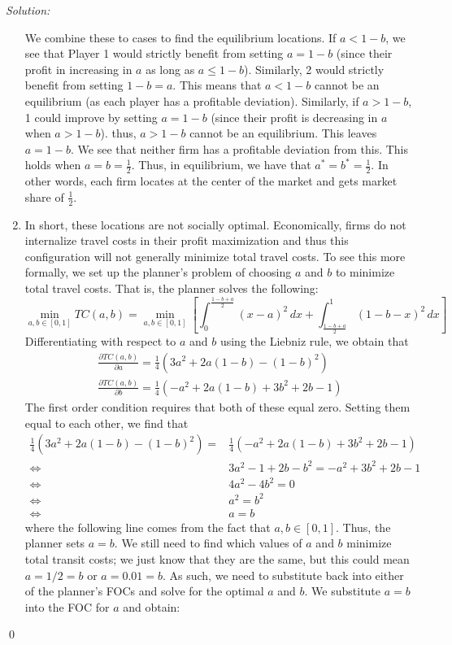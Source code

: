 \documentclass[12pt]{article}
\newenvironment{sol}
    {\emph{Solution:}
    }
    {
    \qed
    }
\begin{document}
\begin{sol}
\begin{enumerate}[label=\alph*) ]
         We combine these to cases to find the equilibrium locations. If $a < 1-b$, we see that Player 1 would strictly benefit from setting $a = 1-b$ (since their profit in increasing in $a$ as long as $a \leq 1-b$). Similarly, 2 would strictly benefit from setting $1- b = a$. This means that $a < 1-b$ cannot be an equilibrium (as each player has a profitable deviation). Similarly, if $a > 1-b$, 1 could improve by setting $a = 1-b$ (since their profit is decreasing in $a$ when $a > 1-b$). thus, $a > 1-b$ cannot be an equilibrium. This leaves $a = 1-b$. We see that neither firm has a profitable deviation from this. This holds when $a = b = \frac{1}{2}$. Thus, in equilibrium, we have that $a^* = b^* = \frac{1}{2}$. In other words, each firm locates at the center of the market and gets market share of $\frac{1}{2}$.
         \item In short, these locations are not socially optimal. Economically, firms do not internalize travel costs in their profit maximization and thus this configuration will not generally minimize total travel costs. To see this more formally, we set up the planner's problem of choosing $a$ and $b$ to minimize total travel costs. That is, the planner solves the following:
        \[\min_{a,b \in [0,1]} TC(a,b) = \min_{a, b \in [0,1]} \left[\int_{0}^{\frac{1-b + a}{2}} (x - a)^2 \, dx +\int_{\frac{1-b + a}{2}}^{1} (1-b - x)^2 \, dx  \right]\] 
        Differentiating with respect to $a$ and $b$ using the Liebniz rule, we obtain that
        \begin{align*}
            \frac{\partial TC(a,b)}{\partial a} = \frac{1}{4}( 3a^2 + 2a(1-b) - (1-b)^2)\\
            \frac{\partial TC(a,b)}{\partial b} = \frac{1}{4}( -a^2 + 2a(1-b) +3b^2 + 2b - 1)
        \end{align*}
        The first order condition requires that both of these equal zero. Setting them equal to each other, we find that
        \begin{align*}
            \frac{1}{4}( 3a^2 + 2a(1-b) - (1-b)^2) =& \frac{1}{4}( -a^2 + 2a(1-b) + 3b^2 + 2b - 1)\\
            \iff & 3a^2 - 1 + 2b - b^2  = - a^2 + 3b^2 + 2b - 1\\
            \iff& 4a^2 - 4b^2 = 0\\
            \iff& a^2 = b^2\\
            \iff& a = b
        \end{align*}
        where the following line comes from the fact that $a,b \in [0,1]$. Thus, the planner sets $a = b$. We still need to find which values of $a$ and $b$ minimize total transit costs; we just know that they are the same, but this could mean $a = 1/2 = b$ or $a = 0.01 = b$. As such, we need to substitute back into either of the planner's FOCs and solve for the optimal $a$ and $b$. We substitute $a = b$ into the FOC for $a$ and obtain:

\end{enumerate}
\end{sol}
\end{document}
